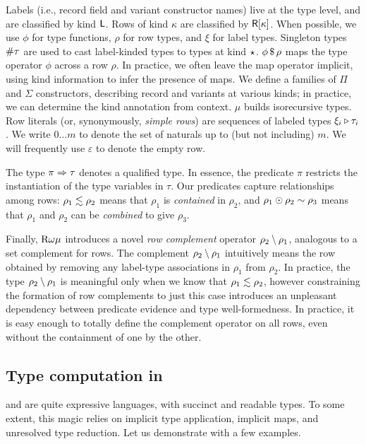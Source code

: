 \documentclass[sigplan,10pt,review]{acmart}\settopmatter{printfolios=true,printccs=false,printacmref=false}
\begin{document}
Labels (i.e., record field and variant constructor names) live at the type level, and are classified by kind $\mathsf{L}$. Rows of kind $\kappa$ are classified by $\mathsf{R}[{\kappa}]$. When possible, we use $\phi$ for type functions, $\rho$ for row types, and $\xi$ for label types. Singleton types $\# \tau$ are used to cast label-kinded types to types at kind $\star_{}$.  ${\phi} \, \mathdollar \, \rho$ maps the type operator $\phi$ across a row $\rho$. In practice, we often leave the map operator implicit, using kind information to infer the presence of maps. We define a families of  $\Pi$ and $\Sigma$ constructors, describing record and variants at various kinds; in practice, we can determine the kind annotation from context. $\mu$ builds isorecursive types. Row literals (or, synonymously, \emph{simple rows}) are sequences of labeled types $\xi_i \triangleright \tau_i$. We write $0 \dots m$ to denote the set of naturals up to (but not including) $m$. We will frequently use $\varepsilon$ to denote the empty row.

The type $\pi \Rightarrow \tau$ denotes a qualified type. In essence, the predicate $\pi$ restricts the instantiation of the type variables in $\tau$. Our predicates capture relationships among rows: $\LeqP {\rho_1} {\rho_2}$ means that $\rho_1$ is \emph{contained} in $\rho_2$, and $\rho_1 \odot \rho_2 \sim \rho_3$ means that $\rho_1$ and $\rho_2$ can be \emph{combined} to give $\rho_3$.

Finally, $\Rome$ introduces a novel \emph{row complement} operator $\rho_2 \setminus \rho_1$, analogous to a set complement for rows. The complement $\rho_2 \setminus \rho_1$ intuitively means the row obtained by removing any label-type associations in $\rho_1$ from $\rho_2$. In practice, the type $\rho_2 \setminus \rho_1$ is meaningful only when we know that $\LeqP {\rho_1} {\rho_2}$, however constraining the formation of row complements to just this case introduces an unpleasant dependency between predicate evidence and type well-formedness. In practice, it is easy enough to totally define the complement operator on all rows, even without the containment of one by the other. 

\subsection{Type computation in \Rome}
\RO and \Rome are quite expressive languages, with succinct and readable types. To some extent, this magic relies on implicit type application, implicit maps, and unresolved type reduction. Let us demonstrate with a few examples.
\end{document}
